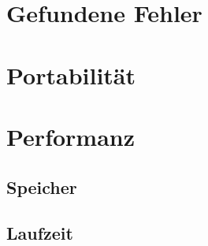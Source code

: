 \documentclass[parskip=full]{scrartcl}
\begin{document}
\section{Gefundene Fehler}

\section{Portabilität}

\section{Performanz}
\subsection{Speicher}
\subsection{Laufzeit}
\end{document}
